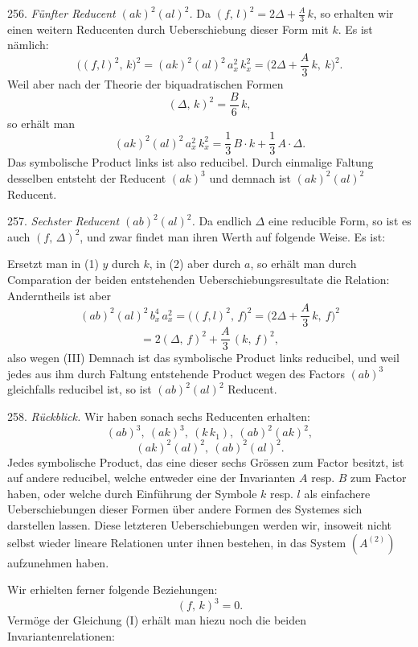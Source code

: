256. \textit{Fünfter Reducent $(ak)^2(al)^2$.} Da $(f,\,l)^2 = 2\varDelta
+ \frac{A}{3}\,k$, so erhalten wir einen weitern Reducenten durch
Ueberschiebung dieser Form mit $k$. Es ist nämlich:
\[
\big((f,l)^2,\,k\big)^2 = (ak)^2(al)^2\,a_x^2\,k_x^2 =
\Big(2\varDelta + \frac{A}{3}\,k,\ k\Big)^2.
\]
Weil aber nach der Theorie der biquadratischen Formen
\[
(\varDelta,\,k)^2 = \frac{B}{6}\,k,
\]
so erhält man
\[
(ak)^2(al)^2\,a_x^2\,k_x^2 = \frac{1}{3}\,B\cdot k + \frac{1}{3}\,A\cdot\varDelta.
\]
Das symbolische Product links ist also reducibel. Durch einmalige
Faltung desselben entsteht der Reducent $(ak)^3$ und demnach ist
$(ak)^2(al)^2$ Reducent.

257. \textit{Sechster Reducent $(ab)^2(al)^2$.} Da endlich $\varDelta$
eine reducible Form, so ist es auch $(f,\,\varDelta)^2$, und zwar findet
man ihren Werth auf folgende Weise. Es ist:


Ersetzt man in (1) $y$ durch $k$, in (2) aber durch $a$, so erhält man
durch Comparation der beiden entstehenden Ueberschiebungsresultate die
Relation:
Anderntheils ist aber
\[
(ab)^2(al)^2\,b_x^4\,a_x^2 = \big((f,l)^2,\,f\big)^2 =
\Big(2\varDelta+\frac{A}{3}\,k,\ f\Big)^2
\]
\[
= 2(\varDelta,\,f)^2 + \frac{A}{3}\,(k,\,f)^2,
\]
also wegen (III)
Demnach ist das symbolische Product links reducibel, und weil jedes aus
ihm durch Faltung entstehende Product wegen des Factors $(ab)^3$
gleichfalls reducibel ist, so ist $(ab)^2(al)^2$ Reducent.

258. \textit{Rückblick.} Wir haben sonach sechs Reducenten erhalten:
\[
(ab)^3,\ (ak)^3,\ (k\,k_1),\ (ab)^2(ak)^2,
\]
\[
(ak)^2(al)^2,\ (ab)^2(al)^2.
\]
Jedes symbolische Product, das eine dieser sechs Grössen zum Factor
besitzt, ist auf andere reducibel, welche entweder eine der Invarianten
$A$ resp. $B$ zum Factor haben, oder welche durch Einführung der
Symbole $k$ resp. $l$ als einfachere Ueberschiebungen dieser Formen
über andere Formen des Systemes sich darstellen lassen. Diese
letzteren Ueberschiebungen werden wir, insoweit nicht selbst wieder
lineare Relationen unter ihnen bestehen, in das System $(A^{(2)})$
aufzunehmen haben.

Wir erhielten ferner folgende Beziehungen:
\[
(f,\,k)^3 = 0.
\]
Vermöge der Gleichung (I) erhält man hiezu noch die beiden
Invariantenrelationen:


